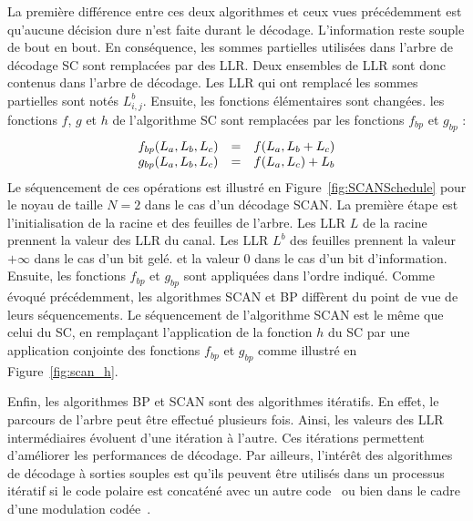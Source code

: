 La première différence entre ces deux algorithmes et ceux vues précédemment est qu'aucune décision dure n'est faite durant le décodage. L'information reste souple de bout en bout.
En conséquence, les sommes partielles utilisées dans l'arbre de décodage SC sont remplacées par des LLR. Deux ensembles de LLR sont donc contenus dans l'arbre de décodage. Les LLR qui ont remplacé les sommes partielles sont notés $L^b_{i,j}$.
Ensuite, les fonctions élémentaires sont changées. les fonctions $f$, $g$ et $h$ de l'algorithme SC sont remplacées par les fonctions $f_{bp}$ et $g_{bp}$ :
\begin{eqnarray}
  \begin{array}{l c l}
    f_{bp}(L_a,L_b,L_c) & = & f(L_a, L_b  + L_c) \\
    g_{bp}(L_a,L_b,L_c) & = & f(L_a, L_c) + L_b
  \end{array}
  \label{eq:bp}
\end{eqnarray}
Le séquencement de ces opérations est illustré en Figure~\ref{fig:SCANSchedule} pour le noyau de taille $N=2$ dans le cas d'un décodage SCAN. La première étape est l'initialisation de la racine et des feuilles de l'arbre. Les LLR $L$ de la racine prennent la valeur des LLR du canal. Les LLR $L^b$ des feuilles prennent la valeur $+\infty$ dans le cas d'un bit gelé. et la valeur $0$ dans le cas d'un bit d'information. Ensuite, les fonctions $f_{bp}$ et $g_{bp}$ sont appliquées dans l'ordre indiqué.
Comme évoqué précédemment, les algorithmes SCAN et BP diffèrent du point de vue de leurs séquencements. Le séquencement de l'algorithme SCAN est le même que celui du SC, en remplaçant l'application de la fonction $h$ du SC par une application conjointe des fonctions $f_{bp}$ et $g_{bp}$ comme illustré en Figure~\ref{fig:scan_h}.

Enfin, les algorithmes BP et SCAN sont des algorithmes itératifs. En effet, le parcours de l'arbre peut être effectué plusieurs fois. Ainsi, les valeurs des LLR intermédiaires évoluent d'une itération à l'autre. Ces itérations permettent d'améliorer les performances de décodage.
Par ailleurs, l'intérêt des algorithmes de décodage à sorties souples est qu'ils peuvent être utilisés dans un processus itératif si le code polaire est concaténé avec un autre code~\cite{balatsoukas-stimming_polar_2017} ou bien dans le cadre d'une modulation codée~\cite{dai_polar_2016}.

